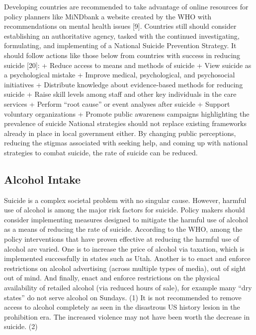 \documentclass[]{article}
\begin{document}
Developing countries are recommended to take advantage of online
resources for policy planners like MiNDbank a website created by the WHO
with recommendations on mental health issues {[}9{]}. Countries still
should consider establishing an authoritative agency, tasked with the
continued investigating, formulating, and implementing of a National
Suicide Prevention Strategy. It should follow actions like those below
from countries with success in reducing suicide {[}20{]}: + Reduce
access to means and methods of suicide + View suicide as a psychological
mistake + Improve medical, psychological, and psychosocial initiatives +
Distribute knowledge about evidence-based methods for reducing suicide +
Raise skill levels among staff and other key individuals in the care
services + Perform ``root cause'' or event analyses after suicide +
Support voluntary organizations + Promote public awareness campaigns
highlighting the prevalence of suicide National strategies should not
replace existing frameworks already in place in local government either.
By changing public perceptions, reducing the stigmas associated with
seeking help, and coming up with national strategies to combat suicide,
the rate of suicide can be reduced.

\subsection{Alcohol Intake}\label{alcohol-intake}

Suicide is a complex societal problem with no singular cause. However,
harmful use of alcohol is among the major risk factors for suicide.
Policy makers should consider implementing measures designed to mitigate
the harmful use of alcohol as a means of reducing the rate of suicide.
According to the WHO, among the policy interventions that have proven
effective at reducing the harmful use of alcohol are varied. One is to
increase the price of alcohol via taxation, which is implemented
successfully in states such as Utah. Another is to enact and enforce
restrictions on alcohol advertising (across multiple types of media),
out of sight out of mind. And finally, enact and enforce restrictions on
the physical availability of retailed alcohol (via reduced hours of
sale), for example many ``dry states'' do not serve alcohol on Sundays.
(1) It is not recommended to remove access to alcohol completely as seen
in the disastrous US history lesion in the prohibition era. The
increased violence may not have been worth the decrease in suicide. (2)
\end{document}
